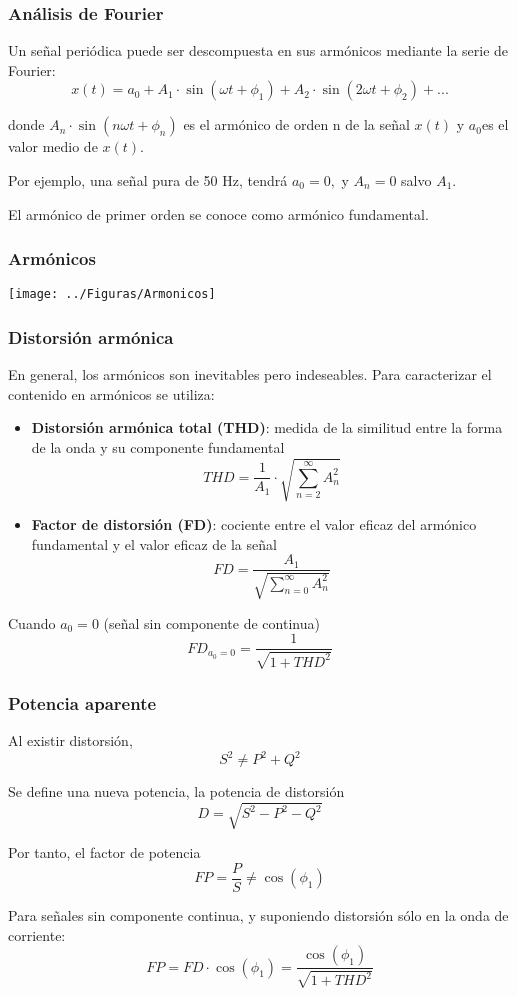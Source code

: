 \documentclass[serif, xcolor=dvipsnames]{beamer}
\begin{document}
\begin{frame}
  \frametitle{Análisis de Fourier}

  Un señal periódica puede ser descompuesta en sus armónicos mediante
  la serie de Fourier:
  \[
  x(t)=a_{0}+A_{1}\cdot\sin(\omega t+\phi_{1})+A_{2}\cdot\sin(2\omega
  t+\phi_{2})+...
  \]


  donde $A_{n}\cdot\sin(n\omega t+\phi_{n})$ es el armónico de orden n
  de la señal $x(t)$ y $a_{0}$es el valor medio de $x(t)$.

  Por ejemplo, una señal pura de 50 Hz, tendrá $a_{0}=0,$ y $A_{n}=0$
  salvo $A_{1}$.

  El armónico de primer orden se conoce como armónico fundamental.


\end{frame}
\begin{frame}
  \frametitle{Armónicos}

  \begin{center}
    \texttt{[image: ../Figuras/Armonicos]}
    \par\end{center}


\end{frame}
\begin{frame}[plain]
  \frametitle{Distorsión armónica}

  En general, los armónicos son inevitables pero indeseables. Para
  caracterizar el contenido en armónicos se utiliza:
  \begin{itemize}
  \item \textbf{Distorsión armónica total (THD)}: medida de la
    similitud entre la forma de la onda y su componente fundamental
    \[
    THD=\frac{1}{A_{1}}\cdot\sqrt{\sum_{n=2}^{\infty}A_{n}^{2}}
    \]

  \item \textbf{Factor de distorsión (FD)}: cociente entre el valor
    eficaz del armónico fundamental y el valor eficaz de la señal
    \[
    FD=\frac{A_{1}}{\sqrt{\sum_{n=0}^{\infty}A_{n}^{2}}}
    \]

\end{itemize}
Cuando $a_{0}=0$ (señal sin componente de continua)
\[
FD_{a_{0}=0}=\frac{1}{\sqrt{1+THD^{2}}}
\]



\end{frame}
\begin{frame}
  \frametitle{Potencia aparente}

  Al existir distorsión,
  \[
  S^{2}\neq P^{2}+Q^{2}
  \]


  Se define una nueva potencia, la potencia de distorsión
  \[
  D=\sqrt{S^{2}-P^{2}-Q^{2}}
  \]


  Por tanto, el factor de potencia
  \[
  FP=\frac{P}{S}\neq\cos(\phi_{1})
  \]


  Para señales sin componente continua, y suponiendo distorsión sólo
  en la onda de corriente:
  \[
  FP=FD\cdot\cos(\phi_{1})=\frac{\cos(\phi_{1})}{\sqrt{1+THD^{2}}}
  \]



\end{frame}
\end{document}
